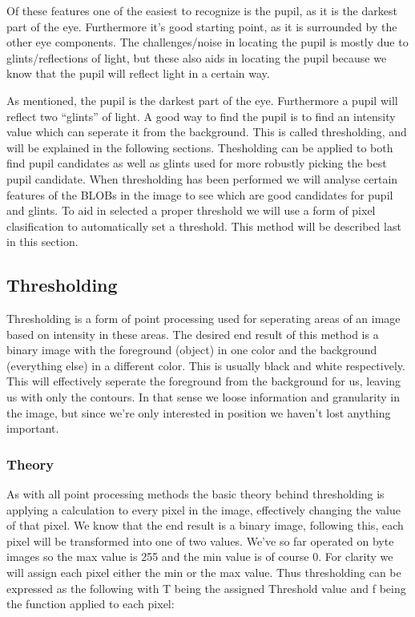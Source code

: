 Of these features one of the easiest to recognize is the pupil, as it is
the darkest part of the eye. Furthermore it's good starting point, as it
is surrounded by the other eye components. The challenges/noise in
locating the pupil is mostly due to glints/reflections of light, but
these also aids in locating the pupil because we know that the pupil
will reflect light in a certain way.

As mentioned, the pupil is the darkest part of the eye. Furthermore a
pupil will reflect two ``glints'' of light. A good way to find the pupil
is to find an intensity value which can seperate it from the background.
This is called thresholding, and will be explained in the following
sections. Thesholding can be applied to both find pupil candidates as
well as glints used for more robustly picking the best pupil candidate.
When thresholding has been performed we will analyse certain features of
the BLOBs in the image to see which are good candidates for pupil and
glints. To aid in selected a proper threshold we will use a form of
pixel clasification to automatically set a threshold. This method will
be described last in this section.

\subsection{Thresholding}

Thresholding is a form of point processing used for seperating areas of
an image based on intensity in these areas. The desired end result of
this method is a binary image with the foreground (object) in one color
and the background (everything else) in a different color. This is
usually black and white respectively. This will effectively seperate the
foreground from the background for us, leaving us with only the
contours. In that sense we loose information and granularity in the
image, but since we're only interested in position we haven't lost
anything important.

\subsubsection{Theory}

As with all point processing methods the basic theory behind
thresholding is applying a calculation to every pixel in the image,
effectively changing the value of that pixel. We know that the end
result is a binary image, following this, each pixel will be transformed
into one of two values. We've so far operated on byte images so the max
value is 255 and the min value is of course 0. For clarity we will
assign each pixel either the min or the max value. Thus thresholding can
be expressed as the following with T being the assigned Threshold value
and f being the function applied to each pixel:

